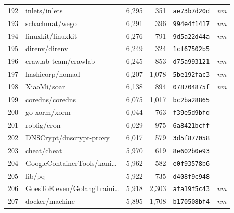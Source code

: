 {\begin{supertabular}{llrrll}
        192 &                      inlets/inlets &  6,295 &    351 &  \texttt{ae73b7d20d} &  \textit{nm} \\
        193 &                     schachmat/wego &  6,291 &    396 &  \texttt{994e4f1417} &  \textit{nm} \\
        194 &                  linuxkit/linuxkit &  6,276 &    791 &  \texttt{9d5a22d44a} &  \textit{nm} \\
        195 &                      direnv/direnv &  6,249 &    324 &  \texttt{1cf67502b5} &              \\
        196 &               crawlab-team/crawlab &  6,245 &    853 &  \texttt{d75a993121} &  \textit{nm} \\
        197 &                    hashicorp/nomad &  6,207 &  1,078 &  \texttt{5be192fac3} &  \textit{nm} \\
        198 &                        XiaoMi/soar &  6,138 &    894 &  \texttt{078704875f} &  \textit{nm} \\
        199 &                    coredns/coredns &  6,075 &  1,017 &  \texttt{bc2ba28865} &              \\
        200 &                       go-xorm/xorm &  6,044 &    763 &  \texttt{f39e5d9bfd} &              \\
        201 &                        robfig/cron &  6,029 &    975 &  \texttt{6a8421bcff} &              \\
        202 &            DNSCrypt/dnscrypt-proxy &  6,017 &    579 &  \texttt{3d5f877058} &              \\
        203 &                        cheat/cheat &  5,970 &    619 &  \texttt{8e602b0e93} &              \\
        204 &    GoogleContainerTools/kani\ldots &  5,962 &    582 &  \texttt{e0f93578b6} &              \\
        205 &                             lib/pq &  5,922 &    735 &  \texttt{d408f9c948} &              \\
        206 &    GoesToEleven/GolangTraini\ldots &  5,918 &  2,303 &  \texttt{afa19f5c43} &  \textit{nm} \\
        207 &                     docker/machine &  5,895 &  1,708 &  \texttt{b170508bf4} &  \textit{nm} \\

\end{supertabular}}
